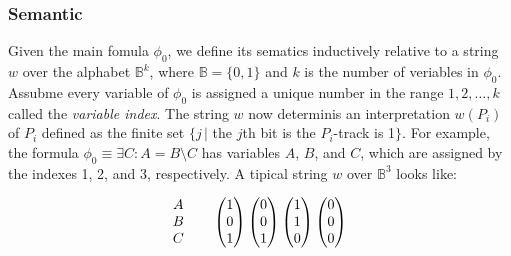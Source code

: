 \documentclass[pdflatex,sn-mathphys-num]{sn-jnl}%
\theoremstyle{thmstyleone}%
\theoremstyle{thmstyletwo}%
\theoremstyle{thmstylethree}%
\begin{document}
        \subsubsection*{Semantic}
            Given the main fomula $\phi_0$, we define its sematics inductively relative to a string $w$ over the alphabet $\mathbb{B}^k$, where $\mathbb{B} = \{0, 1\}$ and $k$ is the number of veriables in $\phi_0$. Assubme every variable of $\phi_0$ is assigned a unique number in the range $1,2,\dots,k$ called the \textit{variable index}. The string $w$ now determinis an interpretation $w(P_i)$ of $P_i$ defined as the finite set $\{j\,|$ the $j$th bit is the $P_i$-track is 1$\}$. For example, the formula $\phi_0 \equiv \exists C : A = B \setminus C$ has variables $A$, $B$, and $C$, which are assigned by the indexes 1, 2, and 3, respectively. A tipical string $w$ over $\mathbb{B}^3$ looks like:

            $$
            \begin{matrix}
                A\\
                B\\
                C
            \end{matrix}
            \hspace*{2em}
            \begin{pmatrix}
                1\\
                0\\
                1
            \end{pmatrix}
            \begin{pmatrix}
                0\\
                0\\
                1
            \end{pmatrix}
            \begin{pmatrix}
                1\\
                1\\
                0
            \end{pmatrix}
            \begin{pmatrix}
                0\\
                0\\
                0\\
            \end{pmatrix}
            $$

            \vspace*{0.5em}
\end{document}
